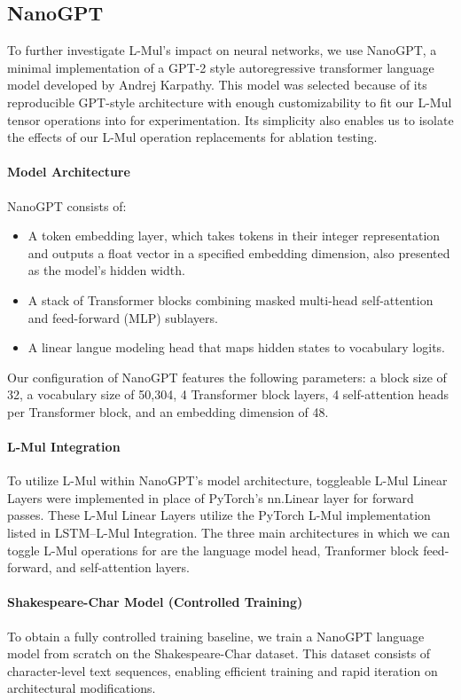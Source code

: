 \documentclass[12pt,letterpaper]{article}
\begin{document}
\subsection{NanoGPT}

To further investigate L-Mul's impact on neural networks, we use NanoGPT, a minimal implementation of a GPT-2 style autoregressive transformer language model developed by Andrej Karpathy. This model was selected because of its reproducible GPT-style architecture with enough customizability to fit our L-Mul tensor operations into for experimentation. Its simplicity also enables us to isolate the effects of our L-Mul operation replacements for ablation testing. 

\paragraph{Model Architecture}
NanoGPT consists of: 
\begin{itemize}
    \item A token embedding layer, which takes tokens in their integer representation and outputs a float vector in a specified embedding dimension, also presented as the model's hidden width. 
    \item A stack of Transformer blocks combining masked multi-head self-attention and feed-forward (MLP) sublayers. 
    \item A linear langue modeling head that maps hidden states to vocabulary logits.
\end{itemize}
Our configuration of NanoGPT features the following parameters: a block size of 32, a vocabulary size of 50,304, 4 Transformer block layers, 4 self-attention heads per Transformer block, and an embedding dimension of 48. 
\paragraph{L-Mul Integration}
To utilize L-Mul within NanoGPT's model architecture, toggleable L-Mul Linear Layers were implemented in place of PyTorch's nn.Linear layer for forward passes. These L-Mul Linear Layers utilize the PyTorch L-Mul implementation listed in LSTM–L-Mul Integration. The three main architectures in which we can toggle L-Mul operations for are the language model head, Tranformer block feed-forward, and self-attention layers.
\paragraph{Shakespeare-Char Model (Controlled Training)}
To obtain a fully controlled training baseline, we train a NanoGPT language model from scratch on the Shakespeare-Char dataset. This dataset consists of character-level text sequences, enabling efficient training and rapid iteration on architectural modifications. 
\end{document}
